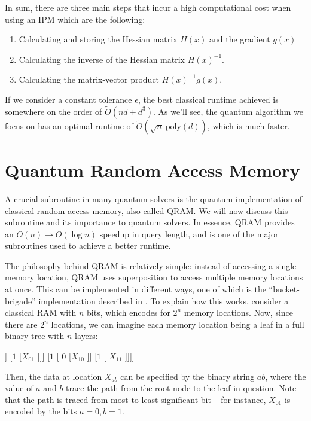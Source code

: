 \documentclass[11pt]{article}
\begin{document}
In sum, there are three main steps that incur a high computational cost when using an IPM which are the following:

\begin{enumerate}
\item Calculating and storing the Hessian matrix $H(x)$ and the gradient $g(x)$
    \item Calculating the inverse of the Hessian matrix $H(x)^{-1}$.
    \item Calculating the matrix-vector product $H(x)^{-1}g(x)$.
\end{enumerate}

If we consider a constant tolerance $\epsilon$, the best classical runtime achieved is somewhere on the order of \( \widetilde
O(nd + d^{3})\). As we'll see, the quantum algorithm we focus on has an optimal runtime of \( \widetilde O(
\sqrt{n} \ \mathrm{poly}(d))\), which is much faster. 

\section{Quantum Random Access Memory}
\label{QRAM}
	A crucial subroutine in many quantum solvers is the quantum implementation of classical 
	random access memory, also called QRAM. We will now discuss this subroutine and its importance to quantum solvers. In essence, QRAM provides an \( O(n) \to O(\log n) \) speedup in 
	query length, and is one of the major subroutines used to achieve a better runtime. 

	The philosophy behind QRAM is relatively simple: instead of accessing a single memory location, 
	QRAM uses superposition to access multiple memory locations at once. This can be implemented in different ways, 
	one of which is the ``bucket-brigade'' implementation described in \cite{giovannettiQuantumRandomAccess2008}. To explain how this works, consider a classical 
	RAM with \( n \) bits, which encodes for \( 2^{n} \) memory locations. Now, since there are \( 2^{n} \) locations, 
	we can imagine each memory location being a leaf in a full binary tree with \( n \) layers:  

	\begin{center}
		\begin{forest}
			[\( \cdot \) [\( 0 \) [\( 0 \) [ \( X_{00} \)]] [\( 1 \) [\( X_{01} \) ]]] [\( 1 \) 
			[ \( 0 \) [\( X_{10} \) ]] [\( 1 \) [ \( X_{11} \) ]]]]
		\end{forest}
	\end{center}
	Then, the data at location \( X_{ab} \) can be specified by the binary string \( ab \), where the value of 
	\( a \) and \( b \) trace the path from the root node to the leaf in question. Note that the path 
	is traced from most to least significant bit -- for instance, \( X_{01} \) 
	is encoded by the bits \( a = 0, b = 1 \). 
\end{document}
